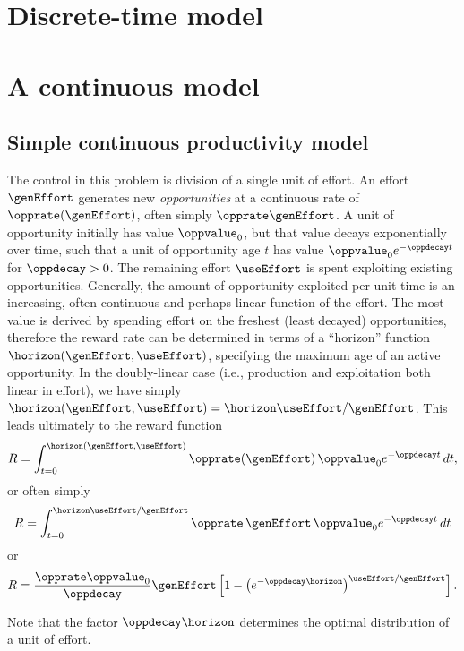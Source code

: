 \documentclass[10pt,a4paper]{article}
\begin{document}
\section{Discrete-time model}

\section{A continuous model}

\subsection{Simple continuous productivity model}

\makecommand{\opprate}{\lambda}
\makecommand{\oppdecay}{\beta}

\makecommand{\horizon}{\tau}

The control in this problem is division of a single unit of effort.
An effort $\genEffort$ generates new \emph{opportunities} at a continuous rate of $\opprate(\genEffort)$,
often simply $\opprate\genEffort$.
A unit of opportunity initially has value $\oppvalue_0$, but
that value decays exponentially over time, such that
a unit of opportunity age $t$ has value $\oppvalue_0 e^{-\oppdecay t}$
for $\oppdecay > 0$.
%
The remaining effort $\useEffort$ is spent exploiting existing opportunities.
Generally, the amount of opportunity exploited per unit time is an increasing, often continuous and perhaps linear function of the effort.
The most value is derived by spending effort on the freshest (least decayed) opportunities,
therefore the reward rate can be determined in terms of a ``horizon'' function  $\horizon(\genEffort,\useEffort)$, specifying the maximum age of an active opportunity.
In the doubly-linear case (i.e., production and exploitation both linear in effort),
we have simply $\horizon(\genEffort,\useEffort) = \horizon \useEffort / \genEffort$.
This leads ultimately to the reward function
%
\begin{equation}
R = \int_{t=0}^{\horizon(\genEffort,\useEffort)}
	\opprate(\genEffort) \, \oppvalue_0 e^{-\oppdecay t} \, dt,
\end{equation}
%
or often simply
%
%
\begin{equation}
R = \int_{t=0}^{\horizon \useEffort / \genEffort}
	\opprate \, \genEffort \, \oppvalue_0 e^{-\oppdecay t} \, dt
\end{equation}
%
or
\begin{equation}
R = \frac{\opprate \oppvalue_0}{\oppdecay} \genEffort
\left[
	1 - \left( e^{-\oppdecay \horizon} \right)^{\useEffort / \genEffort }
\right].
\end{equation}

Note that the factor $\oppdecay \horizon$ determines the optimal distribution of a unit of effort.
\end{document}
